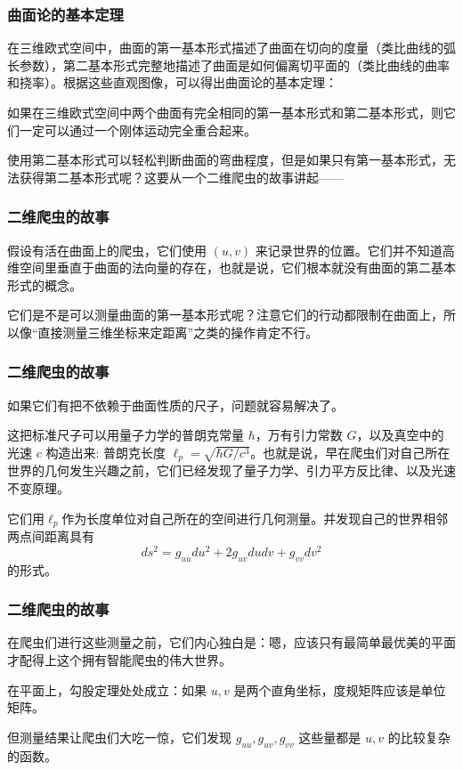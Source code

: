 \documentclass[CJK,13pt]{beamer}
\begin{document}
\begin{frame}
  \frametitle{曲面论的基本定理}
  在三维欧式空间中，曲面的第一基本形式描述了曲面在切向的度量（类比曲线的弧长参数），第二基本形式完整地描述了曲面是如何偏离切平面的（类比曲线的曲率和挠率）。根据这些直观图像，可以得出曲面论的基本定理：

  \skipline
  
  {\blue
    如果在三维欧式空间中两个曲面有完全相同的第一基本形式和第二基本形式，则它们一定可以通过一个刚体运动完全重合起来。
    }
\end{frame}


\begin{frame}
  使用第二基本形式可以轻松判断曲面的弯曲程度，但是如果只有第一基本形式，无法获得第二基本形式呢？这要从一个二维爬虫的故事讲起——
\end{frame}


\begin{frame}
  \frametitle{二维爬虫的故事}
  假设有活在曲面上的爬虫，它们使用 $(u, v)$ 来记录世界的位置。它们并不知道高维空间里垂直于曲面的法向量的存在，也就是说，它们根本就没有曲面的第二基本形式的概念。


  它们是不是可以测量曲面的第一基本形式呢？注意它们的行动都限制在曲面上，所以像“直接测量三维坐标来定距离”之类的操作肯定不行。

\end{frame}  


\begin{frame}
  \frametitle{二维爬虫的故事}
  如果它们有把不依赖于曲面性质的尺子，问题就容易解决了。
  
  \skipline
  
  这把标准尺子可以用量子力学的普朗克常量 $\hbar$，万有引力常数 $G$，以及真空中的光速 $c$ 构造出来: 普朗克长度 $\ell_p = \sqrt{\hbar G/c^3}$。也就是说，早在爬虫们对自己所在世界的几何发生兴趣之前，它们已经发现了量子力学、引力平方反比律、以及光速不变原理。

  \skipline
  
  它们用$\ell_p$作为长度单位对自己所在的空间进行几何测量。并发现自己的世界相邻两点间距离具有
  $$ ds^2 = g_{uu}du^2 + 2g_{uv}du dv + g_{vv}dv^2 $$
  的形式。  
\end{frame}



\begin{frame}
  \frametitle{二维爬虫的故事}
  在爬虫们进行这些测量之前，它们内心独白是：嗯，应该只有最简单最优美的平面才配得上这个拥有智能爬虫的伟大世界。

  \skipline

  在平面上，勾股定理处处成立：如果 $u, v$ 是两个直角坐标，度规矩阵应该是单位矩阵。

  \skipline
  
  但测量结果让爬虫们大吃一惊，它们发现 $g_{uu}, g_{uv}, g_{vv}$ 这些量都是 $u, v$ 的比较复杂的函数。

\end{frame}
\end{document}

